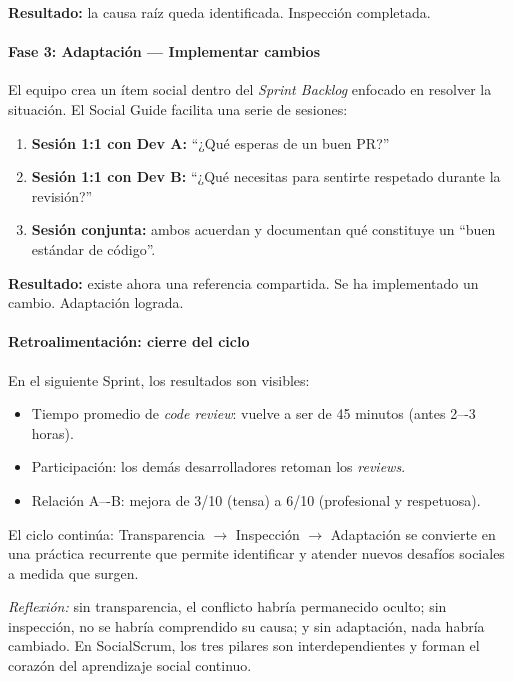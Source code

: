 \textbf{Resultado:} la causa raíz queda identificada. Inspección completada.

\paragraph{Fase 3: Adaptación — Implementar cambios}

El equipo crea un ítem social dentro del \textit{Sprint Backlog} enfocado en resolver la situación. El Social Guide facilita una serie de sesiones:

\begin{enumerate}
    \item \textbf{Sesión 1:1 con Dev A:} ``¿Qué esperas de un buen PR?''
    \item \textbf{Sesión 1:1 con Dev B:} ``¿Qué necesitas para sentirte respetado durante la revisión?''
    \item \textbf{Sesión conjunta:} ambos acuerdan y documentan qué constituye un ``buen estándar de código''.
\end{enumerate}

\textbf{Resultado:} existe ahora una referencia compartida. Se ha implementado un cambio. Adaptación lograda.

\paragraph{Retroalimentación: cierre del ciclo}

En el siguiente Sprint, los resultados son visibles:

\begin{itemize}
    \item Tiempo promedio de \textit{code review}: vuelve a ser de 45 minutos (antes 2–-3 horas). 
    \item Participación: los demás desarrolladores retoman los \textit{reviews}. 
    \item Relación A–-B: mejora de 3/10 (tensa) a 6/10 (profesional y respetuosa). 
\end{itemize}

El ciclo continúa: Transparencia $\rightarrow$ Inspección $\rightarrow$ Adaptación se convierte en una práctica recurrente que permite identificar y atender nuevos desafíos sociales a medida que surgen.

\emph{Reflexión:} sin transparencia, el conflicto habría permanecido oculto; sin inspección, no se habría comprendido su causa; y sin adaptación, nada habría cambiado. En SocialScrum, los tres pilares son interdependientes y forman el corazón del aprendizaje social continuo.

